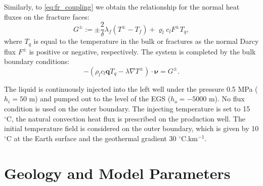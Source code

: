 \documentclass{article}
\renewcommand{\div}{\operatorname{div}}
\newcommand{\eq}[1]{\begin{equation}#1\end{equation}}
\newcommand{\vc}[1]{\boldsymbol{#1}}
\newcommand{\degC}{$^\circ\mathrm{C}$}
\begin{document}
Similarly, to \eqref{eq:fr_coupling} we obtain the relationship for the normal heat fluxes on the fracture faces:
\eq{ 
G^\pm := \pm\frac2\delta \lambda_f(T^\pm-T_f) + 
\varrho_l c_l F^\pm T_q,
}
where $T_q$ is equal to the temperature in the bulk or fractures as the normal Darcy flux $F^\pm$ is positive or negative, respectively. The system is completed by the bulk boundary conditions:
\eq{ 
- (\rho_l c_l \vc q T_q - \lambda\nabla T^\pm)\cdot\vc\nu = G^\pm.
}

The liquid is continuously injected into the left well under the pressure 0.5 MPa ($h_i = 50$ m) and pumped out to the level of the EGS ($h_o = -5000$ m). No flux condition is used on the outer boundary. The injecting temperature is set to 15 \degC, the natural convection heat flux is prescribed on the production well. The initial temperature field is considered on the outer boundary, which is given by 10 \degC{} at the Earth surface and the geothermal gradient 30 \degC.km${}^{-1}$.





\section{Geology and Model Parameters}
\end{document}

